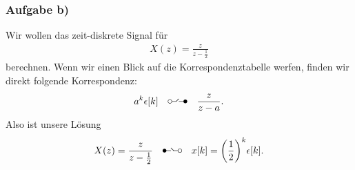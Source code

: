 \documentclass[11pt,a4paper,DIV=12]{scrartcl}
\renewcommand{\ztransf}{\mbox{\setlength{\unitlength}{0.1em}%
                            \begin{picture}(20,10)%
                              \put(2,3){\circle{4}}%
                              \put(4,3){\line(1,0){4.75}}%
                              \multiput(8.625,3.15)(0.25,0.25){11}{%
                                \makebox(0,0){\rmfamily\tiny .}}%
                              \put(17,3){\line(-1,0){5.75}}%
                              \put(18,3){\circle*{4}}%
                            \end{picture}%
                           }
                      }
\renewcommand{\Ztransf}{\mbox{\setlength{\unitlength}{0.1em}%
                            \begin{picture}(20,10)%
                              \put(2,3){\circle*{4}}%
                              \put(3,3){\line(1,0){5.75}}%
                              \multiput(11.375,3.15)(-0.25,0.25){11}{%
                                \makebox(0,0){\rmfamily\tiny .}}%
                              \put(16,3){\line(-1,0){4.75}}%
                              \put(18,3){\circle{4}}%
                            \end{picture}%
                           }
                      }
\begin{document}
\subsubsection{Aufgabe b)}
Wir wollen das zeit-diskrete Signal für
\begin{align}
	X(z)=\frac{z}{z-\frac{1}{2}}
\end{align}
berechnen.
Wenn wir einen Blick auf die Korrespondenztabelle werfen, finden wir direkt folgende Korrespondenz:
\begin{align}
	\label{eq:GeometricProgression}
	a^k\epsilon[k]\quad\ztransf\quad\frac{z}{z-a}.
\end{align}
Also ist unsere Lösung
\begin{align}
	X(z)=\frac{z}{z-\frac{1}{2}}\quad\Ztransf\quad x[k]=\bigg (\frac{1}{2}\bigg)^k\epsilon[k].
\end{align}
\end{document}
